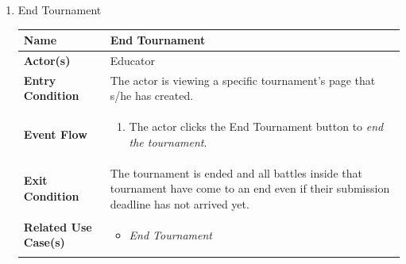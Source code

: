 \begin{enumerate}
\item End Tournament
\begin{center}
    \begin{tabular}{ | m{10em} | m{10cm}| } 
      \hline
      \textbf{Name} & End Tournament \\ 
      \hline
      \textbf{Actor(s)} & Educator \\ 
      \hline
      \textbf{Entry Condition} & The actor is viewing a specific tournament's page that s/he has created. \\ 
      \hline
      \textbf{Event Flow} & 
          \begin{enumerate}[(1)]
              \item The actor clicks the End Tournament button to \textit{end the tournament}.
          \end{enumerate}
      \\ 
      \hline
      \textbf{Exit Condition} & The tournament is ended and all battles inside that tournament have come to an end even if their submission deadline has not arrived yet.  \\ 
      \hline
      \textbf{Related Use Case(s)} & 
      \begin{itemize}
          \item \textit{End Tournament}
      \end{itemize}
          \\ 
      \hline
    \end{tabular}
     \label{tbl:uc22}
\end{center}



\newpage


\end{enumerate}
